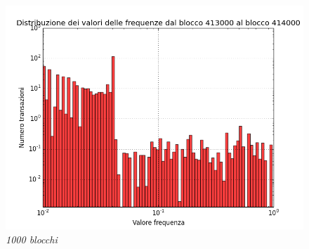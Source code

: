 \begin{figure}[htbp]
	\centering
	\includegraphics[width=\textwidth]{figure/hist1000b}
	\caption{\textit{1000 blocchi}\label{fig:hist1000b}}
\end{figure}